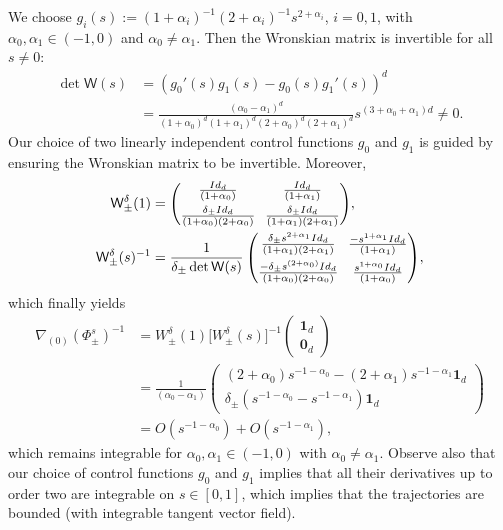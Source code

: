 \documentclass[10pt]{amsart}
\theoremstyle{definition}
\newcommand{\sW}{{\mathsf W}}
\newcommand{\I}{\textup{Id}}\let\Id\I
\newcommand{\U}{\mathbf{1}}
\newcommand{\V}{\mathbf{0}}
\begin{document}
We choose
$g_i(s) := (1+\alpha_i)^{-1} (2+\alpha_i)^{-1} s^{2+\alpha_i}$,
$i=0,1$, with $\alpha_0, \alpha_1 \in (-1,0)$ and
$\alpha_0 \not = \alpha_1$. Then the Wronskian matrix is
invertible for all $s \not =0$:
\begin{equation}
\begin{aligned}
\label{toy-jacobian}
\det \sW(s)
&= \left(g_0'(s) g_1(s)- g_0(s) g_1'(s)\right)^d \\
&= \frac{(\alpha_0 - \alpha_1)^d}{(1+\alpha_0)^d(1+\alpha_1)^d
(2+\alpha_0)^d(2+\alpha_1)^d} s^{(3+\alpha_0+\alpha_1)d} \not = 0.
\end{aligned}
\end{equation}
Our choice of two linearly independent control functions $g_0$
and $g_1$ is guided by ensuring the Wronskian matrix to be
invertible. Moreover,
\begin{equation*}
\begin{aligned}
\sW_\pm ^\delta (1) &=\arraycolsep3.5pt
\begin{pmatrix}
\frac{\I_d}{(1+\alpha_0)} & \frac{\I_d}{(1+\alpha_1)} \\[5pt]
\frac{\delta_\pm \I_d}{(1+\alpha_0)(2+\alpha_0)} &
\frac{\delta_\pm \I_d}{(1+\alpha_1)(2+\alpha_1)}
\end{pmatrix}\!, \\
\sW_\pm ^\delta (s)^{-1} &= \frac{1}{\delta_\pm\det \sW(s)}\arraycolsep3.5pt
\begin{pmatrix}
\frac{\delta_\pm s^{2+\alpha_1} \I_d}{(1+\alpha_1)(2+\alpha_1)} &
\frac{-s^{1+\alpha_1} \I_d}{(1+\alpha_1)} \\[5pt]
\frac{-\delta_\pm s^{(2+\alpha_0)} \I_d}{(1+\alpha_0)(2+\alpha_0)}
& \frac{s^{1+\alpha_0} \I_d}{(1+\alpha_0)}
\end{pmatrix}\!,
\end{aligned}
\end{equation*}
which finally yields
\begin{align*}
\nabla_{(0)} \left(\Phi_\pm ^s \right)^{-1}
& = W^\delta_\pm(1)\big[W^\delta_\pm(s)\big]^{-1}
\begin{pmatrix}
\U_d \\ \V_d
\end{pmatrix} \\
& = \frac{1}{(\alpha_0-\alpha_1)}
\begin{pmatrix}
(2+\alpha_0) s^{-1-\alpha_0} - (2+\alpha_1) s^{-1-\alpha_1}
\U_d
\\
\delta_\pm \left(s^{-1-\alpha_0} - s^{-1-\alpha_1} \right)
\U_d
\end{pmatrix}\\
&= O(s^{-1-\alpha_0}) + O(s^{-1-\alpha_1}),
\end{align*}
which remains integrable for $\alpha_0,\alpha_1 \in
(-1,0)$ with $\alpha_0 \neq \alpha_1$. Observe also that our choice of control functions $g_0$
and $g_1$ implies that all their derivatives up to order two are
integrable on $s \in [0,1]$, which implies that the trajectories
are bounded (with integrable tangent vector field).
\end{document}
